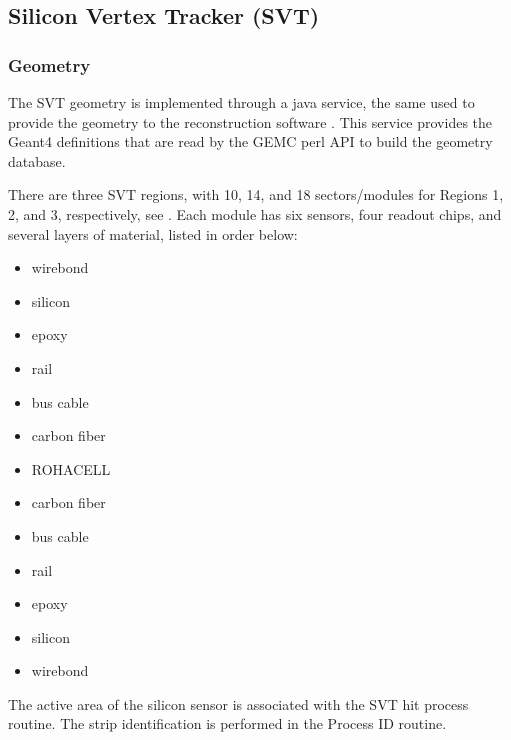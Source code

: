 \subsection{Silicon Vertex Tracker (SVT)}


\subsubsection{Geometry}


The SVT \cite{svt-nim} geometry is implemented through a java service, the same used to provide the geometry
to the reconstruction software \cite{recon-nim}.
This service provides the Geant4 definitions that are read by the GEMC perl API to build the geometry database.

There are three SVT regions, with 10, 14, and 18 sectors/modules for Regions 1, 2, and 3, respectively, see .
Each module has six sensors, four readout chips, and several layers of material, listed in order below:

\begin{itemize}
	\item wirebond
	\item silicon
	\item epoxy
	\item rail
	\item bus cable
	\item carbon fiber
	\item ROHACELL
	\item carbon fiber
	\item bus cable
	\item rail
	\item epoxy
	\item silicon
	\item wirebond
\end{itemize}

The active area of the silicon sensor is associated with the SVT hit process routine.
The strip identification is performed in the Process ID routine.

